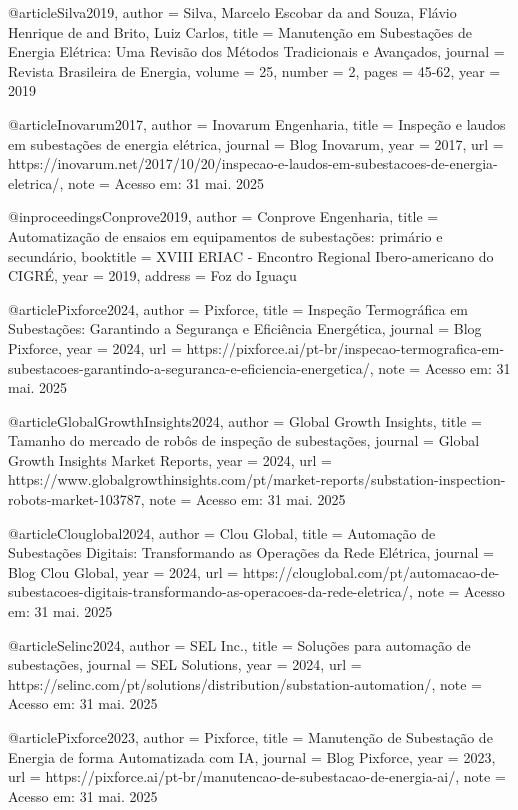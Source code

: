 @article{Silva2019,
  author = {Silva, Marcelo Escobar da and Souza, Flávio Henrique de and Brito, Luiz Carlos},
  title = {Manutenção em Subestações de Energia Elétrica: Uma Revisão dos Métodos Tradicionais e Avançados},
  journal = {Revista Brasileira de Energia},
  volume = {25},
  number = {2},
  pages = {45-62},
  year = {2019}
}

@article{Inovarum2017,
  author = {Inovarum Engenharia},
  title = {Inspeção e laudos em subestações de energia elétrica},
  journal = {Blog Inovarum},
  year = {2017},
  url = {https://inovarum.net/2017/10/20/inspecao-e-laudos-em-subestacoes-de-energia-eletrica/},
  note = {Acesso em: 31 mai. 2025}
}

@inproceedings{Conprove2019,
  author = {Conprove Engenharia},
  title = {Automatização de ensaios em equipamentos de subestações: primário e secundário},
  booktitle = {XVIII ERIAC - Encontro Regional Ibero-americano do CIGRÉ},
  year = {2019},
  address = {Foz do Iguaçu}
}

@article{Pixforce2024,
  author = {Pixforce},
  title = {Inspeção Termográfica em Subestações: Garantindo a Segurança e Eficiência Energética},
  journal = {Blog Pixforce},
  year = {2024},
  url = {https://pixforce.ai/pt-br/inspecao-termografica-em-subestacoes-garantindo-a-seguranca-e-eficiencia-energetica/},
  note = {Acesso em: 31 mai. 2025}
}

@article{GlobalGrowthInsights2024,
  author = {Global Growth Insights},
  title = {Tamanho do mercado de robôs de inspeção de subestações},
  journal = {Global Growth Insights Market Reports},
  year = {2024},
  url = {https://www.globalgrowthinsights.com/pt/market-reports/substation-inspection-robots-market-103787},
  note = {Acesso em: 31 mai. 2025}
}

@article{Clouglobal2024,
  author = {Clou Global},
  title = {Automação de Subestações Digitais: Transformando as Operações da Rede Elétrica},
  journal = {Blog Clou Global},
  year = {2024},
  url = {https://clouglobal.com/pt/automacao-de-subestacoes-digitais-transformando-as-operacoes-da-rede-eletrica/},
  note = {Acesso em: 31 mai. 2025}
}

@article{Selinc2024,
  author = {SEL Inc.},
  title = {Soluções para automação de subestações},
  journal = {SEL Solutions},
  year = {2024},
  url = {https://selinc.com/pt/solutions/distribution/substation-automation/},
  note = {Acesso em: 31 mai. 2025}
}

@article{Pixforce2023,
  author = {Pixforce},
  title = {Manutenção de Subestação de Energia de forma Automatizada com IA},
  journal = {Blog Pixforce},
  year = {2023},
  url = {https://pixforce.ai/pt-br/manutencao-de-subestacao-de-energia-ai/},
  note = {Acesso em: 31 mai. 2025}
}

